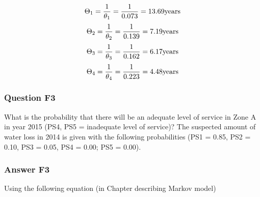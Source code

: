 \[
 \Theta _1 = \frac{1}{{{\theta _1}}} = \frac{1}{{0.073}} = 13.69 {\rm{ 
years}}
\]
\[
 {\Theta _2} = \frac{1}{{{\theta _2}}} = \frac{1}{{0.139}} = 7.19{\rm{  years}}
\]
\[
 {\Theta _3} = \frac{1}{{{\theta _3}}} = \frac{1}{{0.162}} = 6.17{\rm{  years}}
\]
\[
 {\Theta _4} = \frac{1}{{{\theta _4}}} = \frac{1}{{0.223}} = 4.48{\rm{  years}}
\]

\subsubsection{Question F3}
What is the probability that there will be an adequate level of service in Zone
A in year 2015 (PS4, PS5 = inadequate level of service)? The suspected amount of
water loss in 2014 is given with the following probabilities (PS1 = 0.85, PS2 =
0.10, PS3 = 0.05, PS4 = 0.00; PS5 = 0.00).

\subsubsection{Answer F3}
Using the following equation (in Chapter describing Markov model)

